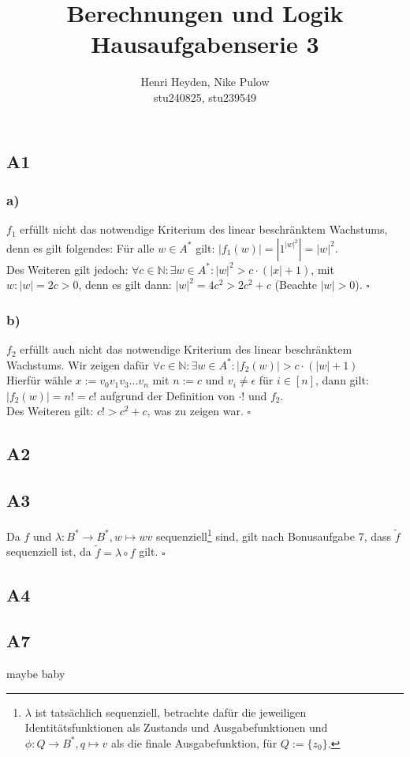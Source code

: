 \documentclass[12pt, a4paper]{article}
\title{Berechnungen und Logik\\Hausaufgabenserie 3}
\author{Henri Heyden, Nike Pulow \\ \small stu240825, stu239549}
\date{}
\newcommand*{\qed}{\null\nobreak\hfill\ensuremath{\square}}
\begin{document}
\maketitle

\doublespacing
\subsection*{A1}
\subsubsection*{a)}
\(f_1\) erfüllt nicht das notwendige Kriterium des linear beschränktem Wachstums, denn es gilt folgendes: Für alle \(w \in A^*\) gilt: \(|f_1(w)| = |1^{|w|^2}| = |w|^2\).\\
Des Weiteren gilt jedoch: \(\forall c \in \mathbb N: \exists w \in A^*: |w|^2 > c\cdot(|x| + 1)\), mit \(w : |w| = 2c > 0\), denn es gilt dann: \(|w|^2 = 4c^2 > 2c^2 + c\) (Beachte \(|w| > 0\)). \qed
\subsubsection*{b)}
\(f_2\) erfüllt auch nicht das notwendige Kriterium des linear beschränktem Wachstums. 
Wir zeigen dafür \(\forall c \in \mathbb N: \exists w \in A^*: |f_2(w)| > c\cdot(|w| + 1)\) \\
Hierfür wähle \(x := v_0v_1v_3 \dots v_n\) mit \(n := c\) und \(v_i \ne \epsilon\) für \(i \in [n]\), dann gilt:
\(|f_2(w)| = n! = c!\) aufgrund der Definition von \(\cdot!\) und \(f_2\).
\\Des Weiteren gilt: \(c! > c^2 + c\), was zu zeigen war. \qed
\subsection*{A2}

\subsection*{A3}
Da \(f\) und \(\lambda : B^* \rightarrow B^*, w \mapsto wv\) sequenziell\footnote[1]{\(\lambda\) ist tatsächlich sequenziell, betrachte dafür die jeweiligen Identitätsfunktionen als Zustands und Ausgabefunktionen und \(\phi : Q \rightarrow B^*, q \mapsto v\) als die finale Ausgabefunktion, für \(Q := \{z_0\}\).} sind, gilt nach Bonusaufgabe 7, dass \(\tilde{f}\) sequenziell ist, da \(\tilde{f} = \lambda \circ f\) gilt. \qed
\subsection*{A4}

\subsection*{A7}
maybe baby
\end{document}
